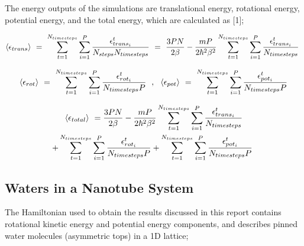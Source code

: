 \documentclass{ece}
\begin{document}
The energy outputs of the simulations are translational energy, rotational energy, potential energy, and the total energy, which are calculated as [1];

\begin{equation} 
\langle \epsilon_{trans} \rangle \hspace{0.125cm} = \hspace{0.125cm} \sum_{t = 1}^{N_{timesteps}} \sum_{i = 1}^{P} \frac{\epsilon_{trans_i}^t}{N_{steps} N_{timesteps}} \hspace{0.125cm} = \hspace{0.125cm} \frac{3 P N }{2 \beta} - \frac{mP}{2 \hbar^2 \beta^2} \sum_{t = 1}^{N_{timesteps}} \sum_{i = 1}^{P} \frac{\epsilon_{trans_i}^t}{N_{timesteps}} \hspace{0.125cm} 
\end{equation}

\begin{equation} 
\langle \epsilon_{rot} \rangle \hspace{0.125cm} = \hspace{0.125cm} \sum_{t = 1}^{N_{timesteps}} \sum_{i = 1}^{P} \frac{\epsilon_{rot_i}^t}{N_{timesteps} P} \hspace{0.225cm} , \hspace{0.225cm} \langle \epsilon_{pot} \rangle \hspace{0.125cm} = \hspace{0.125cm} \sum_{t = 1}^{N_{timesteps}} \sum_{i = 1}^{P} \frac{\epsilon_{pot_i}^t}{N_{timesteps} P}
\end{equation}

\begin{multline*}
\langle \epsilon_{total} \rangle \hspace{0.125cm} = \frac{3 P N }{2 \beta} - \frac{mP}{2 \hbar^2 \beta^2} \sum_{t = 1}^{N_{timesteps}} \sum_{i = 1}^{P} \frac{\epsilon_{trans_i}^t}{N_{timesteps}} \\ + \sum_{t = 1}^{N_{timesteps}} \sum_{i = 1}^{P} \frac{\epsilon_{rot_i}^t}{N_{timesteps} P} + \sum_{t = 1}^{N_{timesteps}} \sum_{i = 1}^{P} \frac{\epsilon_{pot_i}^t}{N_{timesteps} P} \hspace{0.125cm} 
\end{multline*}

\subsection{Waters in a Nanotube System} 

The Hamiltonian used to obtain the results discussed in this report contains rotational kinetic energy and potential energy components, and describes pinned water molecules (asymmetric tops) in a 1D lattice;
\end{document}
